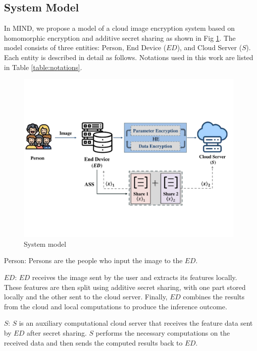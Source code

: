 ﻿\documentclass[conference]{IEEEtran}
\begin{document}
\subsection{System Model}
 In MIND, we propose a model of a cloud image encryption system based on homomorphic encryption and additive secret sharing as shown in Fig \ref{fig:system_model}. The model consists of three entities: Person, End Device ($ED$), and Cloud Server ($S$). Each entity is described in detail as follows. Notations used in this work are listed in Table \ref{table:notations}.
\begin{figure}[ht]
\includegraphics[width=1\linewidth]{fig1.pdf}
\caption{System model} \label{fig:system_model}
\end{figure}

Person: Persons are the people who input the image to the $ED$. 

$ED$: $ED$ receives the image sent by the user and extracts its features locally. These features are then split using additive secret sharing, with one part stored locally and the other sent to the cloud server. Finally, $ED$ combines the results from the cloud and local computations to produce the inference outcome.

$S$: $S$ is an auxiliary computational cloud server that receives the feature data sent by $ED$ after secret sharing. $S$ performs the necessary computations on the received data and then sends the computed results back to $ED$. 

\end{document}
